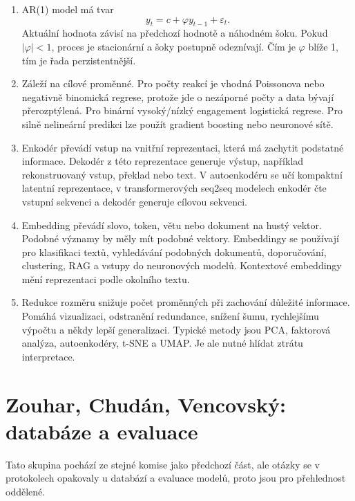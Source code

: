 \documentclass[12pt,a4paper]{article}
\begin{document}
\begin{enumerate}
  \item {}

  AR(1) model má tvar
  \[
    y_t = c + \varphi y_{t-1} + \varepsilon_t.
  \]
  Aktuální hodnota závisí na předchozí hodnotě a náhodném šoku. Pokud \(|\varphi|<1\), proces je
  stacionární a šoky postupně odeznívají. Čím je \(\varphi\) blíže 1, tím je řada perzistentnější.

  \item {}

  Záleží na cílové proměnné. Pro počty reakcí je vhodná Poissonova nebo negativně binomická regrese,
  protože jde o nezáporné počty a data bývají přerozptýlená. Pro binární vysoký/nízký engagement
  logistická regrese. Pro silně nelineární predikci lze použít gradient boosting nebo neuronové sítě.

  \item {}

  Enkodér převádí vstup na vnitřní reprezentaci, která má zachytit podstatné informace. Dekodér z této
  reprezentace generuje výstup, například rekonstruovaný vstup, překlad nebo text. V autoenkodéru se
  učí kompaktní latentní reprezentace, v transformerových seq2seq modelech enkodér čte vstupní sekvenci
  a dekodér generuje cílovou sekvenci.

  \item {}

  Embedding převádí slovo, token, větu nebo dokument na hustý vektor. Podobné významy by měly mít
  podobné vektory. Embeddingy se používají pro klasifikaci textů, vyhledávání podobných dokumentů,
  doporučování, clustering, RAG a vstupy do neuronových modelů. Kontextové embeddingy mění reprezentaci
  podle okolního textu.

  \item {}

  Redukce rozměru snižuje počet proměnných při zachování důležité informace. Pomáhá vizualizaci,
  odstranění redundance, snížení šumu, rychlejšímu výpočtu a někdy lepší generalizaci. Typické metody
  jsou PCA, faktorová analýza, autoenkodéry, t-SNE a UMAP. Je ale nutné hlídat ztrátu interpretace.
\end{enumerate}

\section{Zouhar, Chudán, Vencovský: databáze a evaluace}
Tato skupina pochází ze stejné komise jako předchozí část, ale otázky se v protokolech opakovaly
u databází a evaluace modelů, proto jsou pro přehlednost oddělené.
\end{document}
